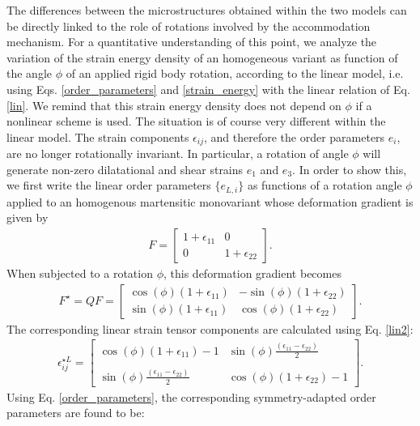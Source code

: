 \documentclass[twocolumn,amsmath,amssymb]{revtex4}
\begin{document}
The differences between the microstructures obtained within the two models can be directly linked to the role of rotations involved by the accommodation mechanism. For a quantitative understanding of this point, we analyze  the variation of the strain energy density of an homogeneous variant as function of the angle $\phi$ of an applied rigid body rotation, according to the linear model, i.e. using Eqs. \ref{order_parameters} and \ref{strain_energy} with the linear relation of Eq. \ref{lin}. We remind that this strain energy density does not depend on $\phi $ if a nonlinear scheme is used. The situation is of course very different within the linear model. The strain components $\epsilon_{ij}$, and therefore the order parameters $e_i$, are no longer rotationally invariant. In particular,  a rotation of angle $\phi$ will generate non-zero dilatational and shear strains $e_1$ and $e_3$. In order to show this,  we first write the linear order parameters $\{e_{L,i}\}$  as  functions of a rotation angle $\phi $ applied to  an homogenous martensitic monovariant   whose  deformation gradient is given by   
\begin{eqnarray}
F = \left[
\begin{matrix}
1+\epsilon_{11}   & 0 \\
0                 & 1+\epsilon_{22}
\end{matrix}\right] .
\end{eqnarray}
When subjected to a rotation $\phi$, this deformation gradient   becomes      
\begin{eqnarray}
F^{\star} = QF  = 
\left[
\begin{matrix}
\cos(\phi)(1+\epsilon_{11})   & -\sin(\phi)(1+\epsilon_{22})\\
\sin(\phi)(1+\epsilon_{11})   &  \cos(\phi)(1+\epsilon_{22})
\end{matrix}\right].
\end{eqnarray}
The corresponding  linear strain tensor components are calculated using Eq. \ref{lin2}:
\begin{eqnarray}
\epsilon_{ij}^{\star L} = \left[
\begin{matrix}
\cos(\phi)(1+\epsilon_{11})-1   & \sin(\phi)\frac{(\epsilon_{11}-\epsilon_{22})}{2} \\\\
\sin(\phi)\frac{(\epsilon_{11}-\epsilon_{22})}{2}   &  \cos(\phi)(1+\epsilon_{22})-1
\end{matrix}\right] .
\end{eqnarray}
Using Eq.  \ref{order_parameters}, the corresponding symmetry-adapted order parameters are found to be:
\end{document}
